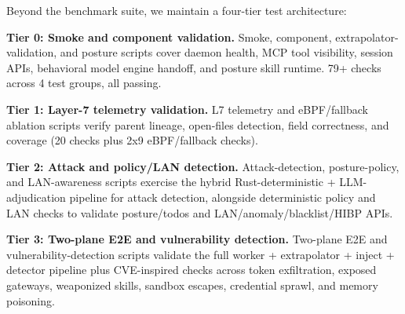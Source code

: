 \documentclass[
]{article}
\begin{document}
Beyond the benchmark suite, we maintain a four-tier test architecture:

\textbf{Tier 0: Smoke and component validation.} Smoke, component,
extrapolator-validation, and posture scripts cover daemon health, MCP
tool visibility, session APIs, behavioral model engine handoff, and
posture skill runtime. 79+ checks across 4 test groups, all passing.

\textbf{Tier 1: Layer-7 telemetry validation.} L7 telemetry and
eBPF/fallback ablation scripts verify parent lineage, open-files
detection, field correctness, and coverage (20 checks plus 2x9
eBPF/fallback checks).

\textbf{Tier 2: Attack and policy/LAN detection.} Attack-detection,
posture-policy, and LAN-awareness scripts exercise the hybrid
Rust-deterministic + LLM-adjudication pipeline for attack detection,
alongside deterministic policy and LAN checks to validate posture/todos
and LAN/anomaly/blacklist/HIBP APIs.

\textbf{Tier 3: Two-plane E2E and vulnerability detection.} Two-plane
E2E and vulnerability-detection scripts validate the full worker +
extrapolator + inject + detector pipeline plus CVE-inspired checks
across token exfiltration, exposed gateways, weaponized skills, sandbox
escapes, credential sprawl, and memory poisoning.
\end{document}

